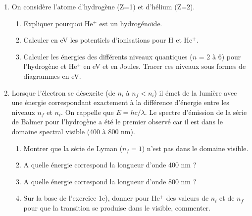 
\begin{enumerate}[\bf 1)]
\item On consid\`ere l'atome d'hydrog\`ene (Z=1) et d'h\'elium (Z=2).
\begin{enumerate}
\item Expliquer pourquoi He$^+$ est un hydrog\'eno\"ide.
\item Calculer en eV les potentiels d'ionisations pour H et He$^+$.
\item Calculer les \'energies des diff\'erents niveaux quantiques ($n$ = 2 \`a 6) pour l'hydrog\`ene et He$^+$
en eV et en Joules. Tracer ces niveaux sous formes de diagrammes en eV.
\end{enumerate}

\item Lorsque l'\'electron se d\'esexcite (de $n_i$ \`a $n_f < n_i$) il \'emet de la lumi\`ere avec
une \'energie correspondant exactement \`a la diff\'erence d'\'energie entre les niveaux $n_f$ et $n_i$.
On rappelle que $E=hc/\lambda$. Le spectre d'\'emission de la s\'erie de Balmer pour l'hydrog\`ene
a \'et\'e le premier observ\'e car il est dans le domaine spectral visible (400 \`a 800 nm).
\begin{enumerate}
\item Montrer que la s\'erie de Lyman ($n_f =1$) n'est pas dans le domaine visible.
\item A quelle \'energie correspond la longueur d'onde 400 nm ?
\item A quelle \'energie correspond la longueur d'onde 800 nm ?
\item Sur la base de l'exercice 1c), donner pour He$^+$ des valeurs de $n_i$ et de $n_f$ pour
que la transition se produise dans le visible, commenter.
\end{enumerate}

\end{enumerate}

